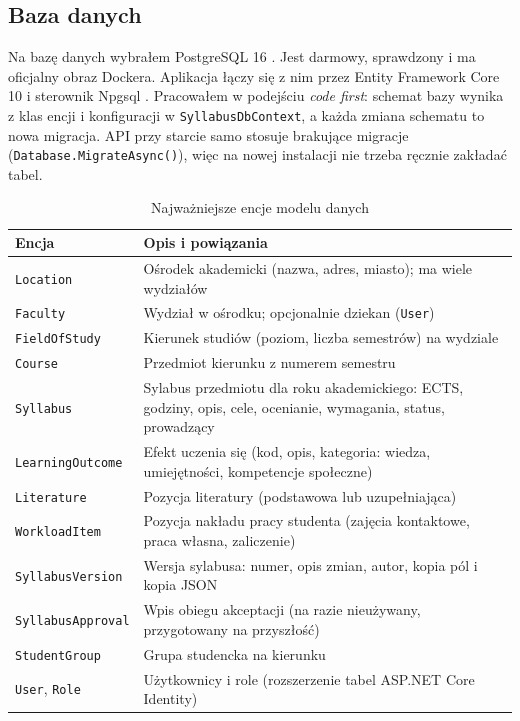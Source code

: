 \documentclass[times]{san}
\begin{document}
\subsection{Baza danych}

Na bazę danych wybrałem PostgreSQL 16 \cite{postgresql}. Jest darmowy, sprawdzony i ma oficjalny obraz Dockera. Aplikacja łączy się z nim przez Entity Framework Core 10 \cite{ms_efcore} i sterownik Npgsql \cite{npgsql}. Pracowałem w podejściu \textit{code first}: schemat bazy wynika z klas encji i konfiguracji w \texttt{SyllabusDbContext}, a każda zmiana schematu to nowa migracja. API przy starcie samo stosuje brakujące migracje (\texttt{Database.MigrateAsync()}), więc na nowej instalacji nie trzeba ręcznie zakładać tabel.

\begin{table}[H]
\centering
\caption{Najważniejsze encje modelu danych}
\label{tab:encje}
\small
\begin{tabularx}{\textwidth}{|l|X|}
\hline
\textbf{Encja} & \textbf{Opis i powiązania} \\
\hline
\texttt{Location} & Ośrodek akademicki (nazwa, adres, miasto); ma wiele wydziałów \\
\texttt{Faculty} & Wydział w ośrodku; opcjonalnie dziekan (\texttt{User}) \\
\texttt{FieldOfStudy} & Kierunek studiów (poziom, liczba semestrów) na wydziale \\
\texttt{Course} & Przedmiot kierunku z numerem semestru \\
\texttt{Syllabus} & Sylabus przedmiotu dla roku akademickiego: ECTS, godziny, opis, cele, ocenianie, wymagania, status, prowadzący \\
\texttt{LearningOutcome} & Efekt uczenia się (kod, opis, kategoria: wiedza, umiejętności, kompetencje społeczne) \\
\texttt{Literature} & Pozycja literatury (podstawowa lub uzupełniająca) \\
\texttt{WorkloadItem} & Pozycja nakładu pracy studenta (zajęcia kontaktowe, praca własna, zaliczenie) \\
\texttt{SyllabusVersion} & Wersja sylabusa: numer, opis zmian, autor, kopia pól i kopia JSON \\
\texttt{SyllabusApproval} & Wpis obiegu akceptacji (na razie nieużywany, przygotowany na przyszłość) \\
\texttt{StudentGroup} & Grupa studencka na kierunku \\
\texttt{User}, \texttt{Role} & Użytkownicy i role (rozszerzenie tabel ASP.NET Core Identity) \\
\hline
\end{tabularx}
\end{table}
\end{document}
